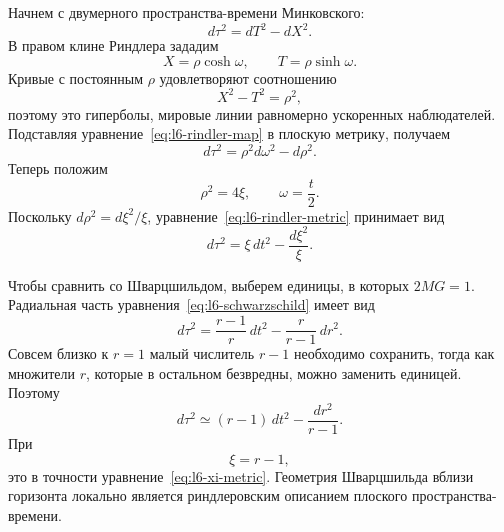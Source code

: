 Начнем с двумерного пространства-времени Минковского:
\begin{equation}
d\tau^{2}=dT^{2}-dX^{2}.
\end{equation}
В правом клине Риндлера зададим
\begin{equation}
X=\rho\cosh\omega,
\qquad
T=\rho\sinh\omega.
\label{eq:l6-rindler-map}
\end{equation}
Кривые с постоянным \(\rho\) удовлетворяют соотношению
\begin{equation}
X^{2}-T^{2}=\rho^{2},
\end{equation}
поэтому это гиперболы, мировые линии равномерно ускоренных наблюдателей.
Подставляя уравнение~\eqref{eq:l6-rindler-map} в плоскую метрику, получаем
\begin{equation}
d\tau^{2}
=\rho^{2}d\omega^{2}-d\rho^{2}.
\label{eq:l6-rindler-metric}
\end{equation}
Теперь положим
\begin{equation}
\rho^{2}=4\xi,
\qquad
\omega=\frac{t}{2}.
\label{eq:l6-rindler-rescale}
\end{equation}
Поскольку \(d\rho^{2}=d\xi^{2}/\xi\), уравнение~\eqref{eq:l6-rindler-metric}
принимает вид
\begin{equation}
d\tau^{2}
=\xi\,dt^{2}-\frac{d\xi^{2}}{\xi}.
\label{eq:l6-xi-metric}
\end{equation}

\begin{classroomqa}
\end{classroomqa}

Чтобы сравнить со Шварцшильдом, выберем единицы, в которых \(2MG=1\). Радиальная часть уравнения~\eqref{eq:l6-schwarzschild} имеет вид
\begin{equation}
d\tau^{2}
=
\frac{r-1}{r}\,dt^{2}
-
\frac{r}{r-1}\,dr^{2}.
\end{equation}
Совсем близко к \(r=1\) малый числитель \(r-1\) необходимо сохранить, тогда как множители \(r\), которые в остальном безвредны, можно заменить единицей. Поэтому
\begin{equation}
d\tau^{2}
\simeq
(r-1)\,dt^{2}
-
\frac{dr^{2}}{r-1}.
\end{equation}
При
\begin{equation}
\xi=r-1,
\end{equation}
это в точности уравнение~\eqref{eq:l6-xi-metric}. Геометрия Шварцшильда вблизи горизонта локально является риндлеровским описанием плоского пространства-времени.

